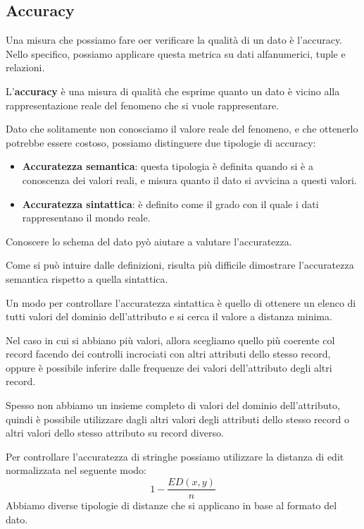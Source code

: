 \subsection{Accuracy}
Una misura che possiamo fare oer verificare la qualità di un dato è l'accuracy.
Nello specifico, possiamo applicare questa metrica su dati alfanumerici,
tuple e relazioni.
\begin{definizione}
      L'\textbf{accuracy} è una misura di qualità che esprime quanto un dato è
      vicino alla rappresentazione reale del fenomeno che si vuole rappresentare.
\end{definizione}
Dato che solitamente non conosciamo il valore reale del fenomeno, e che ottenerlo
potrebbe essere costoso, possiamo distinguere due tipologie di accuracy:
\begin{itemize}
      \item \textbf{Accuratezza semantica}: questa tipologia è definita quando si
            è a conoscenza dei valori reali, e misura quanto il dato si avvicina
            a questi valori.
      \item \textbf{Accuratezza sintattica}: è definito come il grado con il quale
            i dati rappresentano il mondo reale.
\end{itemize}
\begin{nota}
      Conoscere lo schema del dato pyò aiutare a valutare l'accuratezza.
\end{nota}
Come si può intuire dalle definizioni, risulta più difficile dimostrare l'accuratezza
semantica rispetto a quella sintattica.

Un modo per controllare l'accuratezza sintattica è quello di ottenere un elenco
di tutti valori del dominio dell'attributo e si cerca il valore a distanza minima.

Nel caso in cui si abbiano più valori, allora scegliamo quello più coerente col
record facendo dei controlli incrociati con altri attributi dello stesso record,
oppure è possibile inferire dalle frequenze dei valori dell'attributo degli altri
record.

Spesso non abbiamo un insieme completo di valori del dominio dell'attributo, quindi
è possibile utilizzare dagli altri valori degli attributi dello stesso record o
altri valori dello stesso attributo su record diverso.

Per controllare l'accuratezza di stringhe possiamo utilizzare la distanza di edit
normalizzata nel seguente modo:
\begin{equation*}
      1 - \frac{ED(x,y)}{n}
\end{equation*}
Abbiamo diverse tipologie di distanze che si applicano in base al formato del dato.
